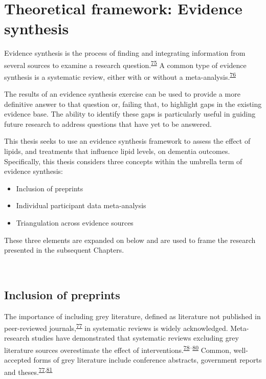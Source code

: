 \documentclass[a4paper, twoside]{templates/ociamthesis}
\providecommand{\tightlist}{%
  \setlength{\itemsep}{0pt}\setlength{\parskip}{0pt}}
\begin{document}
~

\hypertarget{theoretical-framework-evidence-synthesis}{%
\section{Theoretical framework: Evidence synthesis}\label{theoretical-framework-evidence-synthesis}}

Evidence synthesis is the process of finding and integrating information from several sources to examine a research question.\textsuperscript{\protect\hyperlink{ref-donnelly2018}{75}} A common type of evidence synthesis is a systematic review, either with or without a meta-analysis.\textsuperscript{\protect\hyperlink{ref-chandler2019chapter}{76}}

The results of an evidence synthesis exercise can be used to provide a more definitive answer to that question or, failing that, to highlight gaps in the existing evidence base. The ability to identify these gaps is particularly useful in guiding future research to address questions that have yet to be answered.

This thesis seeks to use an evidence synthesis framework to assess the effect of lipids, and treatments that influence lipid levels, on dementia outcomes. Specifically, this thesis considers three concepts within the umbrella term of evidence synthesis:

\begin{itemize}
\tightlist
\item
  Inclusion of preprints
\item
  Individual participant data meta-analysis
\item
  Triangulation across evidence sources
\end{itemize}

These three elements are expanded on below and are used to frame the research presented in the subsequent Chapters.

~

\hypertarget{diverse-sources-preprints}{%
\subsection{Inclusion of preprints}\label{diverse-sources-preprints}}

The importance of including grey literature, defined as literature not published in peer-reviewed journals,\textsuperscript{\protect\hyperlink{ref-paez2017}{77}} in systematic reviews is widely acknowledged. Meta-research studies have demonstrated that systematic reviews excluding grey literature sources overestimate the effect of interventions.\textsuperscript{\protect\hyperlink{ref-conn2003}{78}--\protect\hyperlink{ref-hopewell2007}{80}} Common, well-accepted forms of grey literature include conference abstracts, government reports and theses.\textsuperscript{\protect\hyperlink{ref-paez2017}{77},\protect\hyperlink{ref-lefebvre2019searching}{81}}
\end{document}
